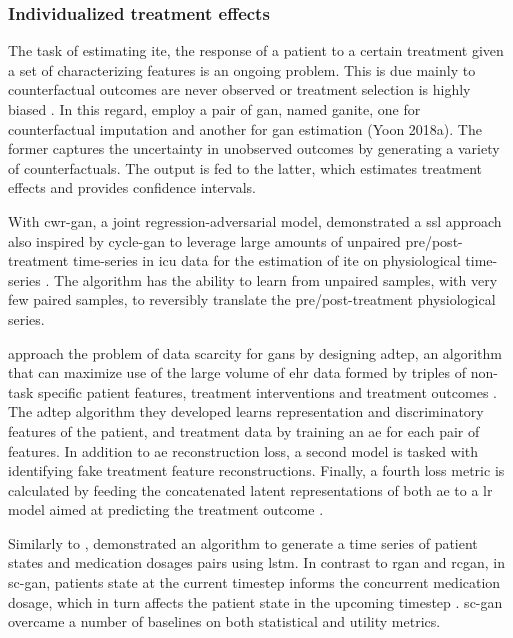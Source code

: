     \subsubsection{Individualized treatment effects}
    
        The task of estimating \gls{ite}, the response of a patient to a certain treatment given a set of characterizing features is an ongoing problem. This is due mainly to counterfactual outcomes are never observed or treatment selection is highly biased \cite{Yoon2018-ite, mcdermott2018semi, walsh2020generating}. In this regard, \citeauthor{Yoon2018-ite} employ a pair of \gls{gan}, named \gls{ganite}, one for counterfactual imputation and another for \gls{gan} estimation (Yoon 2018a). The former captures the uncertainty in unobserved outcomes by generating a variety of counterfactuals. The output is fed to the latter, which estimates treatment effects and provides confidence intervals.\par
    
        With \gls{cwr-gan}, a joint regression-adversarial model, \citeauthor{mcdermott2018semi} demonstrated a \gls{ssl} approach also inspired by \gls{cycle-gan} to leverage large amounts of unpaired pre/post-treatment time-series in \gls{icu} data for the estimation of \gls{ite} on physiological time-series \cite{mcdermott2018semi}. The algorithm has the ability to learn from unpaired samples, with very few paired samples, to reversibly translate the pre/post-treatment physiological series.\par 
    
        \citeauthor{chu2019treatment} approach the problem of data scarcity for \gls{gan}s by designing \gls{adtep}, an algorithm that can maximize use of the large volume of \gls{ehr} data formed by triples of non-task specific patient features, treatment interventions and treatment outcomes \cite{chu2019treatment}. The \gls{adtep} algorithm they developed learns representation and discriminatory features of the patient, and treatment data by training an \gls{ae} for each pair of features. In addition to \gls{ae} reconstruction loss, a second model is tasked with identifying fake treatment feature reconstructions. Finally, a fourth loss metric is calculated by feeding the concatenated latent representations of both \gls{ae} to a \gls{lr} model aimed at predicting the treatment outcome \cite{chu2019treatment}.\par
    
        Similarly to \citeauthor{esteban2017real}, \citeauthor{Wang_2019} demonstrated an algorithm to generate a time series of patient states and medication dosages pairs using \gls{lstm}. In contrast to \gls{rgan} and \gls{rcgan}, in \gls{sc-gan}, patients state at the current timestep informs the concurrent medication dosage, which in turn affects the patient state in the upcoming timestep \cite{Wang_2019}. \gls{sc-gan} overcame a number of baselines on both statistical and utility metrics.
    
